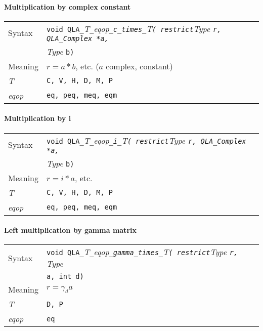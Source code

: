 \documentclass{article}
\newcommand{\tqlaComplex}{QLA\ttdash Complex }
\newcommand{\namespace}{QLA}
\newcommand{\allEqOps}{{\tt eq, peq, meq, eqm}}
\newcommand{\ttdash}{{\tt \_}}
\newcommand{\itt}{\it T}
\newcommand{\extraarg}{}
\begin{document}
\paragraph{Multiplication by complex constant}

\begin{flushleft}
  \begin{tabular}{|l|l|}
  \hline
  Syntax      & {\tt void \namespace}\ttdash\itt\ttdash{\it eqop}\ttdash{\tt c}\ttdash{\tt times}\ttdash\itt{\tt ( restrict}{\it Type }{\tt *r, \tqlaComplex *a,}\\
              & {\it Type }{\tt *b\extraarg)} \\
  \hline
  Meaning     & $r = a*b$, etc. ($a$ complex, constant)
$
$\\
  \hline
  \itt     & {\tt C, V, H, D, M, P} \\
  \hline
  {\it eqop}  & \allEqOps \\
  \hline
  \end{tabular}
\end{flushleft}

\paragraph{Multiplication by i}

\begin{flushleft}
  \begin{tabular}{|l|l|}
  \hline
  Syntax      & {\tt void \namespace}\ttdash\itt\ttdash{\it eqop}\ttdash{\tt i}\ttdash\itt{\tt ( restrict}{\it Type }{\tt *r, \tqlaComplex *a,}\\
              & {\it Type }{\tt *b\extraarg)} \\
  \hline
  Meaning     & $r = i*a$, etc.\\
  \hline
  \itt     & {\tt C, V, H, D, M, P} \\
  \hline
  {\it eqop}  & \allEqOps \\
  \hline
  \end{tabular}
\end{flushleft}

\paragraph{Left multiplication by gamma matrix}

\begin{flushleft}
  \begin{tabular}{|l|l|}
  \hline
  Syntax      & {\tt void \namespace}\ttdash\itt\ttdash{\it eqop}\ttdash{\tt gamma}\ttdash{\tt times}\ttdash\itt{\tt ( restrict}{\it Type }{\tt *r, }{\it Type }\\
              & {\tt *a, int d\extraarg)} \\
  \hline
  Meaning     & $r = \gamma_d a$ \\
  \hline
  \itt     & {\tt D, P} \\
  \hline
  {\it eqop}  & {\tt eq} \\
  \hline
  \end{tabular}
\end{flushleft}
\end{document}
